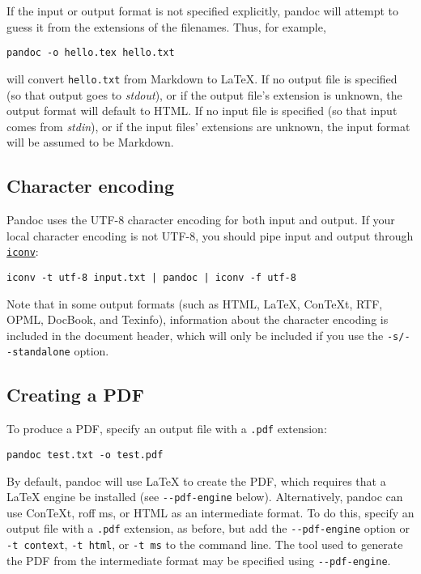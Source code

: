 \documentclass[
]{article}
\begin{document}
If the input or output format is not specified explicitly, pandoc will
attempt to guess it from the extensions of the filenames. Thus, for
example,

\begin{verbatim}
pandoc -o hello.tex hello.txt
\end{verbatim}

will convert \texttt{hello.txt} from Markdown to LaTeX. If no output
file is specified (so that output goes to \emph{stdout}), or if the
output file's extension is unknown, the output format will default to
HTML. If no input file is specified (so that input comes from
\emph{stdin}), or if the input files' extensions are unknown, the input
format will be assumed to be Markdown.

\subsection{Character encoding}\label{character-encoding}

Pandoc uses the UTF-8 character encoding for both input and output. If
your local character encoding is not UTF-8, you should pipe input and
output through
\href{https://www.gnu.org/software/libiconv/}{\texttt{iconv}}:

\begin{verbatim}
iconv -t utf-8 input.txt | pandoc | iconv -f utf-8
\end{verbatim}

Note that in some output formats (such as HTML, LaTeX, ConTeXt, RTF,
OPML, DocBook, and Texinfo), information about the character encoding is
included in the document header, which will only be included if you use
the \texttt{-s/-\/-standalone} option.

\subsection{Creating a PDF}\label{creating-a-pdf}

To produce a PDF, specify an output file with a \texttt{.pdf} extension:

\begin{verbatim}
pandoc test.txt -o test.pdf
\end{verbatim}

By default, pandoc will use LaTeX to create the PDF, which requires that
a LaTeX engine be installed (see \texttt{-\/-pdf-engine} below).
Alternatively, pandoc can use ConTeXt, roff ms, or HTML as an
intermediate format. To do this, specify an output file with a
\texttt{.pdf} extension, as before, but add the \texttt{-\/-pdf-engine}
option or \texttt{-t\ context}, \texttt{-t\ html}, or \texttt{-t\ ms} to
the command line. The tool used to generate the PDF from the
intermediate format may be specified using \texttt{-\/-pdf-engine}.
\end{document}
